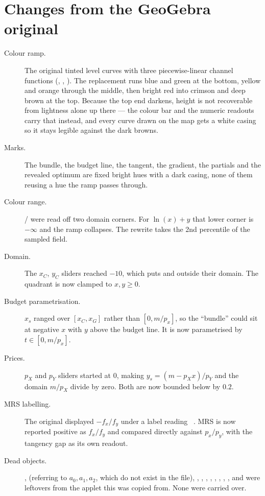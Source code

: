 \documentclass[11pt,a4paper]{appletmanual}
\begin{document}
\section{Changes from the GeoGebra original}

\begin{description}
\item[Colour ramp.] The original tinted level curves with three piecewise-linear
  channel functions (, , ). The
  replacement runs blue and green at the bottom, yellow and orange through the
  middle, then bright red into crimson and deep brown at the top. Because the
  top end darkens, height is not recoverable from lightness alone up there ---
  the colour bar and the numeric readouts carry that instead, and every curve
  drawn on the map gets a white casing so it stays legible against the dark
  browns.
\item[Marks.] The bundle, the budget line, the tangent, the gradient, the
  partials and the revealed optimum are fixed bright hues with a dark casing,
  none of them reusing a hue the ramp passes through.
\item[Colour range.] / were read off two domain corners.
  For $\ln(x) + y$ that lower corner is $-\infty$ and the ramp collapses. The
  rewrite takes the 2nd percentile of the sampled field.
\item[Domain.] The $x_C$, $y_C$ sliders reached $-10$, which puts
   and  outside their domain. The quadrant is now
  clamped to $x, y \ge 0$.
\item[Budget parametrisation.] $x_s$ ranged over $[x_C, x_G]$ rather than
  $[0, m/p_x]$, so the ``bundle'' could sit at negative $x$ with $y$ above the
  budget line. It is now parametrised by $t \in [0, m/p_x]$.
\item[Prices.] $p_X$ and $p_Y$ sliders started at 0, making
  $y_s = (m - p_X x)/p_Y$ and the domain $m/p_X$ divide by zero. Both are now
  bounded below by $0.2$.
\item[MRS labelling.] The original displayed $-f_x/f_y$ under a label reading
  \allowbreak\ . MRS is now reported positive as $f_x/f_y$
  and
  compared directly against $p_x/p_y$, with the tangency gap as its own
  readout.
\item[Dead objects.] ,  (referring to
  $a_0, a_1, a_2$, which do not exist in the file), ,
  , ,
  , , ,
  , ,  and  were leftovers from the
  applet this was copied from. None were carried over.
\end{description}
\end{document}
